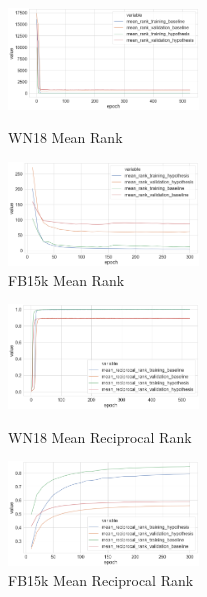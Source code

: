\begin{figure}[H]
	\parbox{.5\linewidth}{
   		\centering
    		\includegraphics[width=0.45\textwidth, height=0.2\textheight]{WN18_mean_rank_Results}
		\caption{WN18 Mean Rank}
		}
	\hfill
	\parbox{.5\linewidth}{
   		\centering
		\includegraphics[width=0.45\textwidth, height=0.2\textheight]{FB15k_mean_rank_Results}
		\caption{FB15k Mean Rank}
		}
\end{figure}


\begin{figure}[H]
	\parbox{.5\linewidth}{
   		\centering
    		\includegraphics[width=0.45\textwidth, height=0.2\textheight]{WN18_mean_reciprocal_rank_Results}
		\caption{WN18 Mean Reciprocal Rank}
		}
	\hfill
	\parbox{.5\linewidth}{
   		\centering
		\includegraphics[width=0.45\textwidth, height=0.2\textheight]{FB15k_mean_reciprocal_rank_Results}
		\caption{FB15k Mean Reciprocal Rank}
		}
\end{figure}


